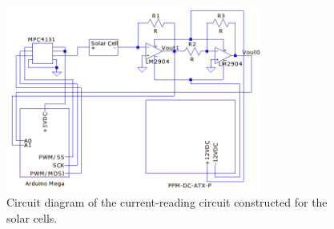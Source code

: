 \begin{figure}[h!]
	\begin{center}
		\includegraphics[width=0.75\textwidth]{figures/solar-cell-circuit-diagram.png}
		\caption{Circuit diagram of the current-reading circuit constructed for the solar cells.}
		\label{fig:solar-cell-circuit}
	\end{center}
\end{figure}
